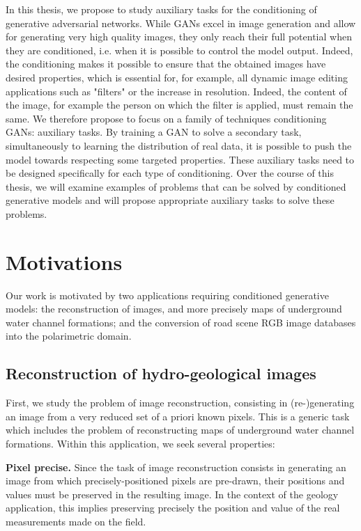In this thesis, we propose to study auxiliary tasks for the conditioning of generative adversarial networks. While \ac{GANs} excel in image generation and allow for generating very high quality images, they only reach their full potential when they are conditioned, i.e. when it is possible to control the model output. Indeed, the conditioning makes it possible to ensure that the obtained images have desired properties, which is essential for, for example, all dynamic image editing applications such as "filters" or the increase in resolution. Indeed, the content of the image, for example the person on which the filter is applied, must remain the same. We therefore propose to focus on a family of techniques conditioning \ac{GANs}: auxiliary tasks. By training a \ac{GAN} to solve a secondary task, simultaneously to learning the distribution of real data, it is possible to push the model towards respecting some targeted properties. These auxiliary tasks need to be designed specifically for each type of conditioning. Over the course of this thesis, we will examine examples of problems that can be solved by conditioned generative models and will propose appropriate auxiliary tasks to solve these problems.


\section*{Motivations}

Our work is motivated by two applications requiring conditioned generative models: the reconstruction of images, and more precisely maps of underground water channel formations; and the conversion of road scene \ac{RGB} image databases into the polarimetric domain. 

\subsection*{Reconstruction of hydro-geological images}

\quad First, we study the problem of image reconstruction, consisting in (re-)generating an image from a very reduced set of a priori known pixels. This is a generic task which includes the problem of reconstructing maps of underground water channel formations. Within this application, we seek several properties:

\textbf{Pixel precise.} Since the task of image reconstruction consists in generating an image from which precisely-positioned pixels are pre-drawn, their positions and values must be preserved in the resulting image. In the context of the geology application, this implies preserving precisely the position and value of the real measurements made on the field.

